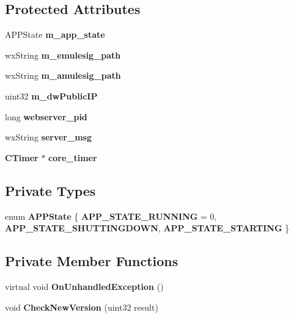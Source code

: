 \subsection*{Protected Attributes}
\begin{DoxyCompactItemize}
\item 
APPState {\bfseries m\_\-app\_\-state}\label{classCamuleApp_a56f7cd10b28d38a2e7c046f33714dfb2}

\item 
wxString {\bfseries m\_\-emulesig\_\-path}\label{classCamuleApp_a24c0af592d0828565c069c4716b30835}

\item 
wxString {\bfseries m\_\-amulesig\_\-path}\label{classCamuleApp_a7d7f5830f2338ea9199959b05d8b2a58}

\item 
uint32 {\bfseries m\_\-dwPublicIP}\label{classCamuleApp_a57a619cf1aa54429fe8e5dec8f60da53}

\item 
long {\bfseries webserver\_\-pid}\label{classCamuleApp_a0d27f829e99a791adc3d5528117747a4}

\item 
wxString {\bfseries server\_\-msg}\label{classCamuleApp_ace8f3848945fd84c45dd64b256d80f4c}

\item 
{\bf CTimer} $\ast$ {\bfseries core\_\-timer}\label{classCamuleApp_af973a856830e968dbf93db01e9c70a30}

\end{DoxyCompactItemize}
\subsection*{Private Types}
\begin{DoxyCompactItemize}
\item 
enum {\bfseries APPState} \{ {\bfseries APP\_\-STATE\_\-RUNNING} =  0, 
{\bfseries APP\_\-STATE\_\-SHUTTINGDOWN}, 
{\bfseries APP\_\-STATE\_\-STARTING}
 \}
\end{DoxyCompactItemize}
\subsection*{Private Member Functions}
\begin{DoxyCompactItemize}
\item 
virtual void {\bfseries OnUnhandledException} ()\label{classCamuleApp_a6f008d970cb2232ce7038a17748c0b35}

\item 
void {\bfseries CheckNewVersion} (uint32 result)\label{classCamuleApp_a23063eee5c285773332cf06678b06cbc}

\end{DoxyCompactItemize}
